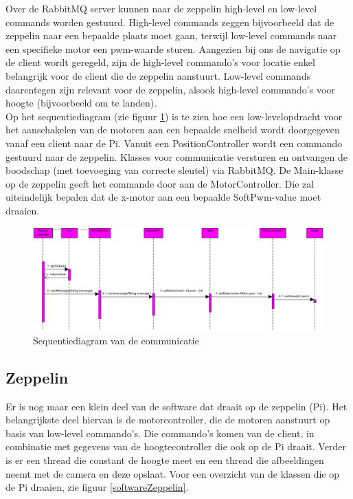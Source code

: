\documentclass[eind]{penoverslag}
\begin{document}
Over de RabbitMQ server kunnen naar de zeppelin high-level en low-level commands worden gestuurd. High-level commands zeggen bijvoorbeeld dat de zeppelin naar een bepaalde plaats moet gaan, terwijl low-level commands naar een specifieke motor een pwm-waarde sturen. Aangezien bij ons de navigatie op de client wordt geregeld, zijn de high-level commando's voor locatie enkel belangrijk voor de client die de zeppelin aanstuurt. Low-level commands daarentegen zijn relevant voor de zeppelin, alsook high-level commando's voor hoogte (bijvoorbeeld om te landen). \\

Op het sequentiediagram (zie figuur \ref{Sequence}) is te zien hoe een low-levelopdracht voor het aanschakelen van de motoren aan een bepaalde snelheid wordt doorgegeven vanaf een client naar de Pi. Vanuit een PositionController wordt een commando gestuurd naar de zeppelin. Klasses voor communicatie versturen en ontvangen de boodschap (met toevoeging van correcte sleutel) via RabbitMQ. De Main-klasse op de zeppelin geeft het commande door aan de MotorController. Die zal uiteindelijk bepalen dat de x-motor aan een bepaalde SoftPwm-value moet draaien.
\\

\begin{figure}[H]
\begin{center}
\includegraphics[width=1\textwidth]{SequenceDiagram1.png}
\end{center}
\caption{Sequentiediagram van de communicatie}
\label{Sequence}
\end{figure} 

\subsection{Zeppelin}
Er is nog maar een klein deel van de software dat draait op de zeppelin (Pi). Het belangrijkste deel hiervan is de motorcontroller, die de motoren aanstuurt op basis van low-level commando's. Die commando's komen van de client, in combinatie met gegevens van de hoogtecontroller die ook op de Pi draait. Verder is er een thread die constant de hoogte meet en een thread die afbeeldingen neemt met de camera en deze opslaat. Voor een overzicht van de klassen die op de Pi draaien, zie figuur \ref{softwareZeppelin}.\\
\end{document}
